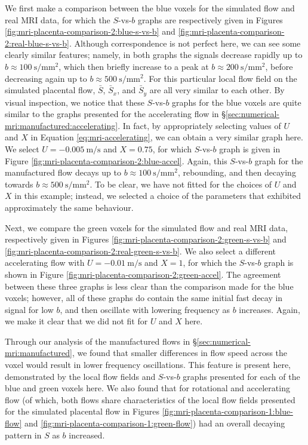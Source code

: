         We first make a comparison between the blue voxels for the simulated flow and real MRI data, for which the $S$-vs-$b$ graphs are respectively given in Figures \ref{fig:mri-placenta-comparison-2:blue-s-vs-b} and \ref{fig:mri-placenta-comparison-2:real-blue-s-vs-b}. Although correspondence is not perfect here, we can see some clearly similar features; namely, in both graphs the signals decrease rapidly up to $b \approx \qty{100}{\second\per\milli\metre^2}$, which then briefly increase to a peak at $b \approx \qty{200}{\second\per\milli\metre^2}$, before decreasing again up to $b \approx \qty{500}{\second\per\milli\metre^2}$. For this particular local flow field on the simulated placental flow, $\bar{S}$, $\bar{S}_x$, and $\bar{S}_y$ are all very similar to each other. By visual inspection, we notice that these $S$-vs-$b$ graphs for the blue voxels are quite similar to the graphs presented for the accelerating flow in \S\ref{sec:numerical-mri:manufactured:accelerating}. In fact, by appropriately selecting values of $U$ and $X$ in Equation \eqref{eq:mri-accelerating}, we can obtain a very similar graph here. We select $U = \qty{-0.005}{\metre\per\second}$ and $X = 0.75$, for which $S$-vs-$b$ graph is given in Figure \ref{fig:mri-placenta-comparison-2:blue-accel}. Again, this $S$-vs-$b$ graph for the manufactured flow decays up to $b \approx \qty{100}{\second\per\milli\metre^2}$, rebounding, and then decaying towards $b \approx \qty{500}{\second\per\milli\metre^2}$. To be clear, we have not fitted for the choices of $U$ and $X$ in this example; instead, we selected a choice of the parameters that exhibited approximately the same behaviour.
        
        Next, we compare the green voxels for the simulated flow and real MRI data, respectively given in Figures \ref{fig:mri-placenta-comparison-2:green-s-vs-b} and \ref{fig:mri-placenta-comparison-2:real-green-s-vs-b}. We also select a different accelerating flow with $U = \qty{-0.01}{\metre\per\second}$ and $X = 1$, for which the $S$-vs-$b$ graph is shown in Figure \ref{fig:mri-placenta-comparison-2:green-accel}. The agreement between these three graphs is less clear than the comparison made for the blue voxels; however, all of these graphs do contain the same initial fast decay in signal for low $b$, and then oscillate with lowering frequency as $b$ increases. Again, we make it clear that we did not fit for $U$ and $X$ here.

        Through our analysis of the manufactured flows in \S\ref{sec:numerical-mri:manufactured}, we found that smaller differences in flow speed across the voxel would result in lower frequency oscillations. This feature is present here, demonstrated by the local flow fields and $S$-vs-$b$ graphs presented for each of the blue and green voxels here. We also found that for rotational and accelerating flow (of which, both flows share characteristics of the local flow fields presented for the simulated placental flow in Figures \ref{fig:mri-placenta-comparison-1:blue-flow} and \ref{fig:mri-placenta-comparison-1:green-flow}) had an overall decaying pattern in $S$ as $b$ increased.

